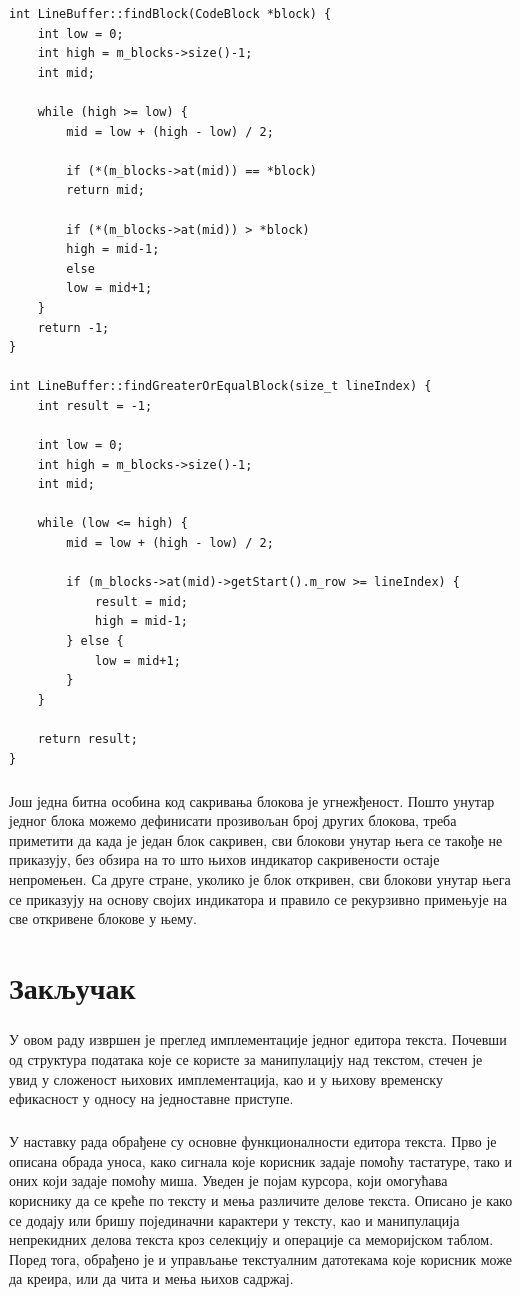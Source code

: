 \documentclass[12pt,oneside]{memoir}
\begin{document}
\begin{verbatim}
int LineBuffer::findBlock(CodeBlock *block) {
	int low = 0;
	int high = m_blocks->size()-1;
	int mid;
	
	while (high >= low) {
		mid = low + (high - low) / 2;
		
		if (*(m_blocks->at(mid)) == *block)
		return mid;
		
		if (*(m_blocks->at(mid)) > *block)
		high = mid-1;
		else
		low = mid+1;
	}
	return -1;
}

int LineBuffer::findGreaterOrEqualBlock(size_t lineIndex) {
	int result = -1;
	
	int low = 0;
	int high = m_blocks->size()-1;
	int mid;
	
	while (low <= high) {
		mid = low + (high - low) / 2;
		
		if (m_blocks->at(mid)->getStart().m_row >= lineIndex) {
			result = mid;
			high = mid-1;
		} else {
			low = mid+1;
		}
	}
	
	return result;
}
\end{verbatim}

\paragraph{}
Још једна битна особина код сакривања блокова је угнежђеност. Пошто унутар једног
блока можемо дефинисати прозивољан број других блокова, треба приметити да када је
један блок сакривен, сви блокови унутар њега се такође не приказују, без обзира
на то што њихов индикатор сакривености остаје непромењен. Са друге стране, уколико
је блок откривен, сви блокови унутар њега се приказују на основу својих индикатора и правило се рекурзивно примењује на све откривене блокове у њему.  

\chapter{Закључак}

\paragraph{}
У овом раду извршен је преглед имплементације једног едитора текста. Почевши од структура података које се користе за манипулацију над
текстом, стечен је увид у сложеност њихових имплементација, као и
у њихову временску ефикасност у односу на једноставне приступе.

\paragraph{}
У наставку рада обрађене су основне функционалности едитора текста.
Прво је описана обрада уноса, како сигнала које корисник задаје помоћу тастатуре, тако и оних који задаје помоћу миша. Уведен је појам курсора,
који омогућава кориснику да се креће по тексту и мења различите делове
текста. Описано је како се додају или бришу појединачни карактери 
у тексту, као и манипулација непрекидних делова текста кроз селекцију
и операције са меморијском таблом. Поред тога, обрађено је и управљање
текстуалним датотекама које корисник може да креира, или да чита и мења
њихов садржај.
\end{document}
